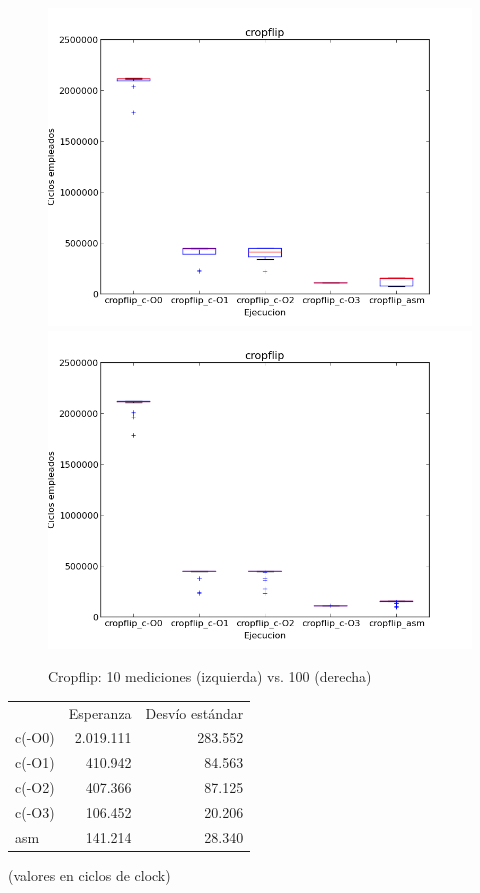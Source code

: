 \documentclass[a4paper]{article}
\begin{document}
\begin{figure}[htbp]
\centering
\includegraphics[scale=0.33]{imagenes/tiemposcropflip.png}
\includegraphics[scale=0.33]{imagenes/tiemposcropflip100.png}
\caption{Cropflip: 10 mediciones (izquierda) vs. 100 (derecha)}
\label{fig:graficos_cropflip}
\end{figure}

\begin{tabular}{l|r|r} %
 & Esperanza & Desvío estándar \\
 c(-O0) & 2.019.111 & 283.552 \\
 c(-O1) & 410.942 & 84.563 \\
 c(-O2) & 407.366 & 87.125 \\
 c(-O3) & 106.452 & 20.206 \\
 asm & 141.214 & 28.340
\end{tabular}
(valores en ciclos de clock)
\end{document}
